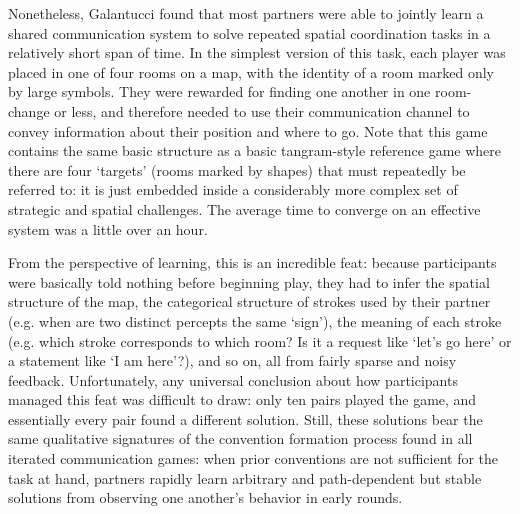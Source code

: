 \documentclass[11pt, floatsintext, man]{apa6}
\begin{document}

Nonetheless, Galantucci found that most partners were able to jointly learn a shared communication system to solve repeated spatial coordination tasks in a relatively short span of time. In the simplest version of this task, each player was placed in one of four rooms on a map, with the identity of a room marked only by large symbols. They were rewarded for finding one another in one room-change or less, and therefore needed to use their communication channel to convey information about their position and where to go. Note that this game contains the same basic structure as a basic tangram-style reference game where there are four `targets' (rooms marked by shapes) that must repeatedly be referred to: it is just embedded inside a considerably more complex set of strategic and spatial challenges. The average time to converge on an effective system was a little over an hour. 

From the perspective of learning, this is an incredible feat: because participants were basically told nothing before beginning play, they had to infer the spatial structure of the map, the categorical structure of strokes used by their partner (e.g. when are two distinct percepts the same `sign'), the meaning of each stroke (e.g. which stroke corresponds to which room? Is it a request like `let's go here' or a statement like `I am here'?), and so on, all from fairly sparse and noisy feedback. Unfortunately, any universal conclusion about how participants managed this feat was difficult to draw: only ten pairs played the game, and essentially every pair found a different solution. Still, these solutions bear the same qualitative signatures of the convention formation process found in all iterated communication games: when prior conventions are not sufficient for the task at hand, partners rapidly learn arbitrary and path-dependent but stable solutions from observing one another's behavior in early rounds. 
\end{document}
